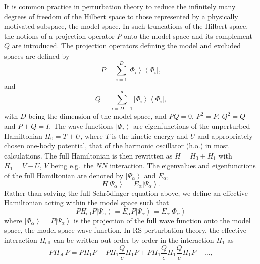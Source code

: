 \documentclass[twoside,12pt]{article}
\begin{document}
It is common practice in perturbation theory to reduce the infinitely
many degrees of freedom of the Hilbert space to those represented
by a physically motivated subspace, the model space.
In such truncations of the Hilbert space, the notions of a projection
operator $P$ onto the model space and its complement $Q$ are
introduced. The projection operators defining the model and excluded
spaces are defined by
\begin{equation}
        P=\sum_{i=1}^{D} \left|\Phi_i\right\rangle
        \left\langle\Phi_i\right |,
\end{equation}
and
\begin{equation}
        Q=\sum_{i=D+1}^{\infty} \left|\Phi_i\right\rangle
        \left\langle\Phi_i\right |,
\end{equation}
with $D$ being the dimension of the model space, and $PQ=0$, $P^2 =P$,
$Q^2 =Q$ and $P+Q=I$. The wave functions $\left|\Phi_i\right\rangle$
are eigenfunctions
of the unperturbed Hamiltonian $H_0 = T+U$, where $T$ is the kinetic
energy and $U$ and appropriately chosen one-body potential, that of the
harmonic oscillator (h.o.) in most calculations. The full Hamiltonian
is then rewritten as $H=H_0 +H_1$ with $H_1=V-U$, $V$ being e.g.\ the
$NN$    interaction. The eigenvalues
and eigenfunctions of the full Hamiltonian are denoted by
$\left|\Psi_{\alpha}\right\rangle$
and $E_{\alpha}$,
\begin{equation}
                H\left|\Psi_{\alpha}\right\rangle=
                E_{\alpha}\left|\Psi_{\alpha}\right\rangle.
\end{equation}
Rather than solving the full Schr\"{o}dinger equation above, we define
an effective Hamiltonian acting within the model space such
that
\begin{equation}
               PH_{\mathrm{eff}}P\left|\Psi_{\alpha}\right\rangle=
               E_{\alpha}P\left|\Psi_{\alpha}\right\rangle=
              E_{\alpha}\left|\Phi_{\alpha}\right\rangle
\end{equation}
where $\left|\Phi_{\alpha}\right\rangle=P\left|\Psi_{\alpha}\right\rangle$
is the projection of the full wave function
onto the model space, the model space wave function.
In RS perturbation theory, the effective interaction
$H_{\mathrm{eff}}$ can be written out order by order in the
interaction $H_1$ as
\begin{equation}
               PH_{\mathrm{eff}}P=PH_1P +PH_1\frac{Q}{e}H_1 P+
               PH_1\frac{Q}{e}H_1 \frac{Q}{e}H_1 P+\dots,
               \label{eq:effint}
\end{equation}
\end{document}
